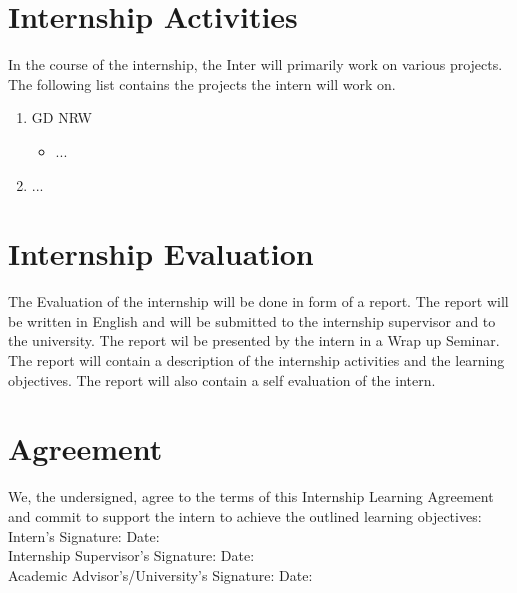 \documentclass{article}
\begin{document}
\section{Internship Activities}
In the course of the internship, the Inter will primarily work on various projects. The following list contains the projects the intern will work on.

\begin{enumerate}
    \item GD NRW
    \begin{itemize}
        \item ...
    \end{itemize}
    \item ... 
    \end{enumerate}

\section{Internship Evaluation}
The Evaluation of the internship will be done in form of a report. The report will be written in English and will be submitted to the internship supervisor and to the university. The report wil be presented by the intern in a Wrap up Seminar. The report will contain a description of the internship activities and the learning objectives. The report will also contain a self evaluation of the intern. 

\section{Agreement}

We, the undersigned, agree to the terms of this Internship Learning Agreement and commit to support the intern to achieve the outlined learning objectives:
\\

Intern's Signature: \hspace{3cm} Date: 
\\

Internship Supervisor's Signature: \hspace{3cm} Date:
\\

Academic Advisor's/University's Signature: \hspace{3cm} Date:
\\
\end{document}
